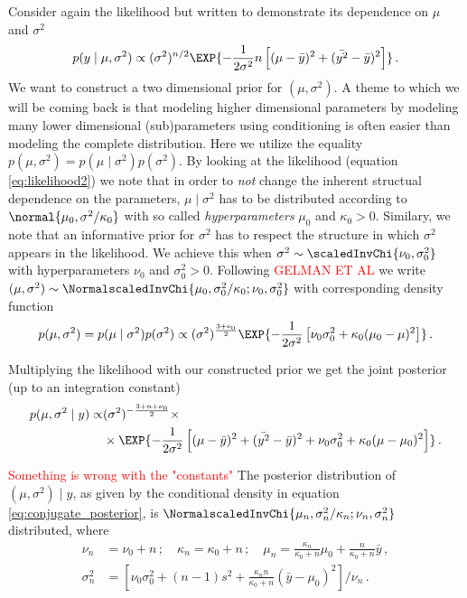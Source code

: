 Consider again the likelihood but written to demonstrate its dependence on $\mu$ and $\sigma^2$
\begin{align}
  p(y \mid \mu, \sigma^2) \propto (\sigma^2)^{n/2} \EXP{-\frac{1}{2\sigma^2} n\left[ (\mu - \bar{y})^2 + (\bar{y^2} - \bar{y})^2 \right]} \,.
  \label{eq:likelihood2}
\end{align}
We want to construct a two dimensional prior for $(\mu, \sigma^2)$.
A theme to which we will be coming back is that modeling higher dimensional parameters by modeling many lower dimensional (sub)parameters using conditioning is often easier than modeling the complete distribution.
Here we utilize the equality $p(\mu, \sigma^2) = p(\mu \mid \sigma^2) p(\sigma^2)$.
By looking at the likelihood (equation \ref{eq:likelihood2}) we note that in order to \emph{not} change the inherent structual dependence on the parameters, $\mu \mid \sigma^2$ has to be distributed according to $\normal{\mu_0, \sigma^2 / \kappa_0}$ with so called \emph{hyperparameters} $\mu_0$ and $\kappa_0 > 0$.
Similary, we note that an informative prior for $\sigma^2$ has to respect the structure in which $\sigma^2$ appears in the likelihood.
We achieve this when $\sigma^2 \sim \scaledInvChi{\nu_0, \sigma_0^2}$ with hyperparameters $\nu_0$ and $\sigma_0^2 > 0$.
Following \textcolor{red}{GELMAN ET AL} we write $(\mu, \sigma^2) \sim \NormalscaledInvChi{\mu_0, \sigma_0^2 / \kappa_0; \nu_0, \sigma_0^2}$ with corresponding density function
\begin{align}
  p(\mu, \sigma^2) = p(\mu \mid \sigma^2) p(\sigma^2) \propto (\sigma^2)^{\frac{3 + \nu_0}{2}} \EXP{-\frac{1}{2\sigma^2} \left[\nu_0 \sigma_0^2 + \kappa_0(\mu_0 - \mu)^2 \right]} \,.
\end{align}

Multiplying the likelihood with our constructed prior we get the joint posterior (up to an integration constant)
\begin{align}
  p(\mu, \sigma^2 \mid y) \propto& (\sigma^2)^{-\frac{3 + n + \nu_0}{2}} \times\\
  & \times \EXP{-\frac{1}{2 \sigma^2} \left[ (\mu - \bar{y})^2 + (\bar{y^2} - \bar{y})^2 + \nu_0\sigma_0^2 + \kappa_0(\mu - \mu_0)^2 \right]} \,.
  \label{eq:conjugate_posterior}
\end{align}

\begin{proposition}
  \textcolor{red}{Something is wrong with the "constants"}
  The posterior distribution of $(\mu, \sigma^2) \mid y$, as given by the conditional density in equation \ref{eq:conjugate_posterior}, is $\NormalscaledInvChi{\mu_n, \sigma_n^2/\kappa_n; \nu_n, \sigma_n^2}$ distributed, where
  \begin{align*}
    \nu_n &= \nu_0 + n \,; \quad \kappa_n = \kappa_0 + n \,; \quad \mu_n =\frac{\kappa_n}{\kappa_0 + n}\mu_0 + \frac{n}{\kappa_0 + n}\bar{y} \,,\\
    \sigma_n^2 &= \left[\nu_0 \sigma_0^2 + (n-1)s^2 + \frac{\kappa_n n}{\kappa_0 + n} (\bar{y} - \mu_0)^2\right] /\nu_n \,.
  \end{align*}
  \label{prop:posterior_conjugate}
\end{proposition}

